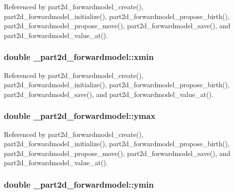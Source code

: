 Referenced by part2d\+\_\+forwardmodel\+\_\+create(), part2d\+\_\+forwardmodel\+\_\+initialize(), part2d\+\_\+forwardmodel\+\_\+propose\+\_\+birth(), part2d\+\_\+forwardmodel\+\_\+propose\+\_\+move(), part2d\+\_\+forwardmodel\+\_\+save(), and part2d\+\_\+forwardmodel\+\_\+value\+\_\+at().

\subsubsection[{\texorpdfstring{xmin}{xmin}}]{\setlength{\rightskip}{0pt plus 5cm}double \+\_\+part2d\+\_\+forwardmodel\+::xmin}\hypertarget{struct__part2d__forwardmodel_ae3bd6a2449b7131eb256168237ad8a22}{}\label{struct__part2d__forwardmodel_ae3bd6a2449b7131eb256168237ad8a22}


Referenced by part2d\+\_\+forwardmodel\+\_\+create(), part2d\+\_\+forwardmodel\+\_\+initialize(), part2d\+\_\+forwardmodel\+\_\+propose\+\_\+birth(), part2d\+\_\+forwardmodel\+\_\+save(), and part2d\+\_\+forwardmodel\+\_\+value\+\_\+at().

\subsubsection[{\texorpdfstring{ymax}{ymax}}]{\setlength{\rightskip}{0pt plus 5cm}double \+\_\+part2d\+\_\+forwardmodel\+::ymax}\hypertarget{struct__part2d__forwardmodel_ae3effad1ad4f653c9824cf4bca0aaa0b}{}\label{struct__part2d__forwardmodel_ae3effad1ad4f653c9824cf4bca0aaa0b}


Referenced by part2d\+\_\+forwardmodel\+\_\+create(), part2d\+\_\+forwardmodel\+\_\+initialize(), part2d\+\_\+forwardmodel\+\_\+propose\+\_\+birth(), part2d\+\_\+forwardmodel\+\_\+propose\+\_\+move(), part2d\+\_\+forwardmodel\+\_\+save(), and part2d\+\_\+forwardmodel\+\_\+value\+\_\+at().

\subsubsection[{\texorpdfstring{ymin}{ymin}}]{\setlength{\rightskip}{0pt plus 5cm}double \+\_\+part2d\+\_\+forwardmodel\+::ymin}\hypertarget{struct__part2d__forwardmodel_a6387788a27052e73e569e99343b0d5d8}{}\label{struct__part2d__forwardmodel_a6387788a27052e73e569e99343b0d5d8}


